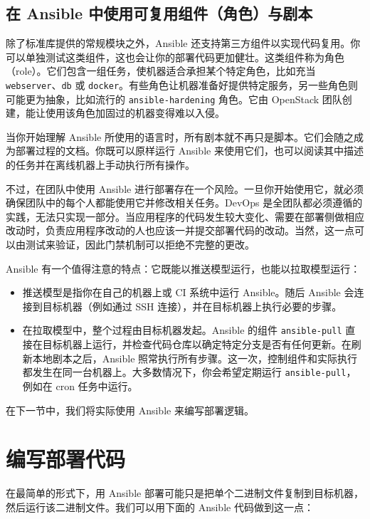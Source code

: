 \subsection{在 Ansible 中使用可复用组件（角色）与剧本}

\label{idx:943}
\label{idx:944}
\label{idx:945}
\label{idx:946}
除了标准库提供的常规模块之外，Ansible 还支持第三方组件以实现代码复用。你可以单独测试这类组件，这也会让你的部署代码更加健壮。这类组件称为角色（role）。它们包含一组任务，使机器适合承担某个特定角色，比如充当 \texttt{webserver}、\texttt{db} 或 \texttt{docker}。有些角色让机器准备好提供特定服务，另一些角色则可能更为抽象，比如流行的 \texttt{ansible-hardening} 角色。它由 OpenStack 团队创建，能让使用该角色加固过的机器变得难以入侵。

当你开始理解 Ansible 所使用的语言时，所有剧本就不再只是脚本。它们会随之成为部署过程的文档。你既可以原样运行 Ansible 来使用它们，也可以阅读其中描述的任务并在离线机器上手动执行所有操作。

\label{idx:947}
\label{idx:948}
\label{idx:949}
\label{idx:950}
不过，在团队中使用 Ansible 进行部署存在一个风险。一旦你开始使用它，就必须确保团队中的每个人都能使用它并修改相关任务。DevOps 是全团队都必须遵循的实践，无法只实现一部分。当应用程序的代码发生较大变化、需要在部署侧做相应改动时，负责应用程序改动的人也应该一并提交部署代码的改动。当然，这一点可以由测试来验证，因此门禁机制可以拒绝不完整的更改。

Ansible 有一个值得注意的特点：它既能以推送模型运行，也能以拉取模型运行：

\begin{itemize}
\item 推送模型是指你在自己的机器上或 CI 系统中运行 Ansible。随后 Ansible 会连接到目标机器（例如通过 SSH 连接），并在目标机器上执行必要的步骤。
\item 在拉取模型中，整个过程由目标机器发起。Ansible 的组件 \texttt{ansible-pull} 直接在目标机器上运行，并检查代码仓库以确定特定分支是否有任何更新。在刷新本地剧本之后，Ansible 照常执行所有步骤。这一次，控制组件和实际执行都发生在同一台机器上。大多数情况下，你会希望定期运行 \texttt{ansible-pull}，例如在 cron 任务中运行。
\end{itemize}

在下一节中，我们将实际使用 Ansible 来编写部署逻辑。

\section{编写部署代码}

\label{idx:951}
在最简单的形式下，用 Ansible 部署可能只是把单个二进制文件复制到目标机器，然后运行该二进制文件。我们可以用下面的 Ansible 代码做到这一点：

